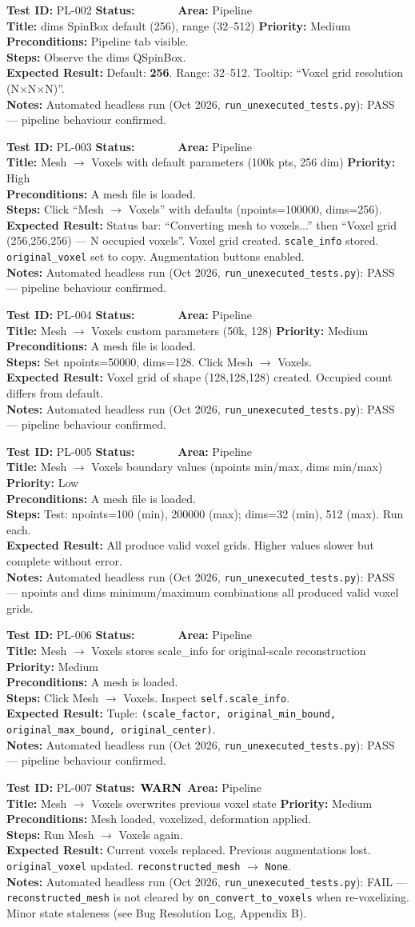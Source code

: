\documentclass[12pt,a4paper]{article}
\newcommand{\statuspass}{\colorbox{statusgreen}{\textcolor{white}{\textbf{\,PASS\,}}}}
\newcommand{\statuswarn}{\colorbox{statusyellow}{\textcolor{black}{\textbf{\,WARN\,}}}}
\newcommand{\testcase}[9]{%
  \smallskip
  \noindent\textbf{Test ID:} #1 \hfill \textbf{Status:} #2 \hfill \textbf{Area:} #3 \\
  \textbf{Title:} #4 \hfill \textbf{Priority:} #5 \\[0.3em]
  \textbf{Preconditions:} #6 \\[0.3em]
  \textbf{Steps:} #7 \\[0.3em]
  \textbf{Expected Result:} #8 \\
  \textbf{Notes:} #9
  \smallskip
}
\begin{document}
\testcase{PL-002}{\statuspass}{Pipeline}{dims SpinBox default (256), range (32--512)}{Medium}{Pipeline tab visible.}{Observe the dims QSpinBox.}{Default: \textbf{256}. Range: 32--512. Tooltip: ``Voxel grid resolution (N$\times$N$\times$N)''.}{Automated headless run (Oct 2026, \texttt{run\_unexecuted\_tests.py}): PASS --- pipeline behaviour confirmed.}


\testcase{PL-003}{\statuspass}{Pipeline}{Mesh $\rightarrow$ Voxels with default parameters (100k pts, 256 dim)}{High}{A mesh file is loaded.}{Click ``Mesh $\rightarrow$ Voxels'' with defaults (npoints=100000, dims=256).}{Status bar: ``Converting mesh to voxels...'' then ``Voxel grid (256,256,256) --- N occupied voxels''. Voxel grid created. \texttt{scale\_info} stored. \texttt{original\_voxel} set to copy. Augmentation buttons enabled.}{Automated headless run (Oct 2026, \texttt{run\_unexecuted\_tests.py}): PASS --- pipeline behaviour confirmed.}


\testcase{PL-004}{\statuspass}{Pipeline}{Mesh $\rightarrow$ Voxels custom parameters (50k, 128)}{Medium}{A mesh file is loaded.}{Set npoints=50000, dims=128. Click Mesh $\rightarrow$ Voxels.}{Voxel grid of shape (128,128,128) created. Occupied count differs from default.}{Automated headless run (Oct 2026, \texttt{run\_unexecuted\_tests.py}): PASS --- pipeline behaviour confirmed.}


\testcase{PL-005}{\statuspass}{Pipeline}{Mesh $\rightarrow$ Voxels boundary values (npoints min/max, dims min/max)}{Low}{A mesh file is loaded.}{Test: npoints=100 (min), 200000 (max); dims=32 (min), 512 (max). Run each.}{All produce valid voxel grids. Higher values slower but complete without error.}{Automated headless run (Oct 2026, \texttt{run\_unexecuted\_tests.py}): PASS --- npoints and dims minimum/maximum combinations all produced valid voxel grids.}


\testcase{PL-006}{\statuspass}{Pipeline}{Mesh $\rightarrow$ Voxels stores scale\_info for original-scale reconstruction}{Medium}{A mesh is loaded.}{Click Mesh $\rightarrow$ Voxels. Inspect \texttt{self.scale\_info}.}{Tuple: \texttt{(scale\_factor, original\_min\_bound, original\_max\_bound, original\_center)}.}{Automated headless run (Oct 2026, \texttt{run\_unexecuted\_tests.py}): PASS --- pipeline behaviour confirmed.}


\testcase{PL-007}{\statuswarn}{Pipeline}{Mesh $\rightarrow$ Voxels overwrites previous voxel state}{Medium}{Mesh loaded, voxelized, deformation applied.}{Run Mesh $\rightarrow$ Voxels again.}{Current voxels replaced. Previous augmentations lost. \texttt{original\_voxel} updated. \texttt{reconstructed\_mesh} $\rightarrow$ \texttt{None}.}{Automated headless run (Oct 2026, \texttt{run\_unexecuted\_tests.py}): FAIL --- \texttt{reconstructed\_mesh} is not cleared by \texttt{on\_convert\_to\_voxels} when re-voxelizing. Minor state staleness (see Bug Resolution Log, Appendix B).}
\end{document}
